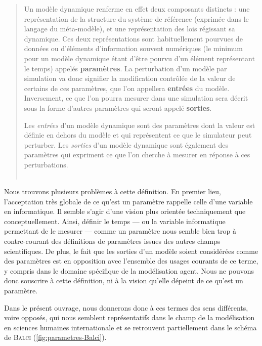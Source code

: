 \begin{quotation}
	\noindent \og
	Un modèle dynamique renferme en effet deux composants distincts : une représentation de la structure du système de référence (exprimée dans le langage du méta-modèle), et une représentation des lois régissant sa dynamique.
	Ces deux représentations sont habituellement pourvues de données ou d'éléments d'information souvent numériques (le minimum pour un modèle dynamique étant d'être pourvu d'un élément représentant le temps) appelés \textbf{paramètres}.
	La \og perturbation\fg{} d'un modèle par simulation va donc signifier la modification contrôlée de la valeur de certains de ces paramètres, que l'on appellera \textbf{entrées} du modèle.
	Inversement, ce que l'on pourra mesurer dans une simulation sera décrit sous la forme d'autres paramètres qui seront appelé \textbf{sorties}.
	
	\noindent Les \textit{entrées} d'un modèle dynamique sont des paramètres dont la valeur est définie en dehors du modèle et qui représentent ce que le simulateur peut perturber.
	Les \textit{sorties} d'un modèle dynamique sont également des paramètres qui expriment ce que l'on cherche à mesurer en réponse à ces perturbations.\fg{}\\
	\mbox{}~ \hfill \autocite[8]{treuil_modelisation_2008}
\end{quotation}

Nous trouvons plusieurs problèmes à cette définition.
En premier lieu, l'acceptation très globale de ce qu'est un paramètre rappelle celle d'une variable en informatique.
Il semble s'agir d'une vision plus orientée techniquement que conceptuellement.
Ainsi, définir le temps --- ou la variable informatique permettant de le mesurer --- comme un paramètre nous semble bien trop à contre-courant des définitions de paramètres issues des autres champs scientifiques.
De plus, le fait que les sorties d'un modèle soient considérées comme des paramètres est en opposition avec l'ensemble des usages courants de ce terme, y compris dans le domaine spécifique de la modélisation agent.
Nous ne pouvons donc souscrire à cette définition, ni à la vision qu'elle dépeint de ce qu'est un paramètre.

Dans le présent ouvrage, nous donnerons donc à ces termes des sens différents, voire opposés, qui nous semblent représentatifs dans le champ de la modélisation en sciences humaines internationale et se retrouvent partiellement dans le schéma de \textsc{Balci} (\cref{fig:parametres-Balci}).
\clearpage

